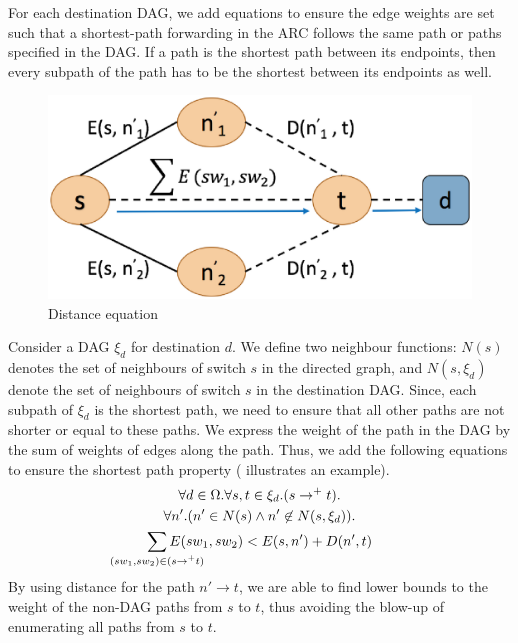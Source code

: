 For each destination DAG, we add equations to ensure the 
edge weights are set such that a shortest-path forwarding in the ARC 
follows the same path or paths specified in the DAG. If a path
is the shortest path between its endpoints, then every 
subpath of the path has to be the shortest between its endpoints
as well. 
\begin{figure}[h!] 
	\centering
	\includegraphics[width=0.8\columnwidth]{figures/distanceEquation.eps}
	\caption{Distance equation} \label{fig:disteq}
\end{figure}
Consider a DAG $\xi_d$ for destination $d$. We define two neighbour
functions: $N(s)$ denotes the set of neighbours of switch $s$ 
in the directed graph, and $N(s, \xi_d)$ denote the set of
neighbours of switch $s$ in the destination DAG. 
Since, each subpath of $\xi_d$ is the shortest path,
we need to ensure that all other
paths are not shorter or equal to these paths.  
We express the weight of the  
path in the DAG by the sum of weights of 
edges along the path. 
Thus, we add the following equations to ensure the
shortest path property ( illustrates 
an example).
\begin{multline} \label{eq:uniq}
		\forall d \in \Omega. \forall s, t \in \xi_d. (s \rightarrow^+ t).\\ 
		\forall n'. (n' \in N(s) \wedge n' \not\in N(s, \xi_d)). \\
		\sum_{\mathclap{\substack{(sw_1, sw_2) \in (s \rightarrow^+ t)}}} 
		E(sw_1, sw_2) < E(s, n') + D(n', t)
\end{multline}
By using distance for the path $n' \rightarrow t$, we 
are able to find lower bounds to the weight of the non-DAG 
paths from $s$ to $t$,
thus avoiding the blow-up of enumerating all paths from $s$
to $t$. 


